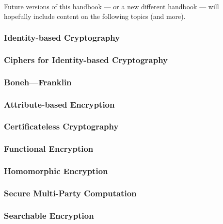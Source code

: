 \vspace{7.5cm}

Future versions of this handbook --- or a new different handbook --- will hopefully include content on the following topics (and more).

\subsubsection{Identity-based Cryptography}\label{future_sec:identity_based_cryptography}
\subsubsection{Ciphers for Identity-based Cryptography}\label{future_sec:identity_based_cryptography:ciphers}
\subsubsection{Boneh---Franklin}\label{future_sec:identity_based_cryptography:ciphers:boneh_franklin}
\subsubsection{Attribute-based Encryption}\label{future_sec:advanced_cryptography:attribute_based_encryption}
\subsubsection{Certificateless Cryptography}\label{future_sec:asymmetric_cryptography:certificateless}
\subsubsection{Functional Encryption}\label{future_sec:advanced_cryptography:functional_encryption}
\subsubsection{Homomorphic Encryption}\label{future_sec:advanced_cryptography:homomorphic_encryption}
\subsubsection{Secure Multi-Party Computation}\label{future_sec:advanced_cryptography:secure_multi_party_computation}
\subsubsection{Searchable Encryption}\label{future_sec:advanced_cryptography:searchable_encryption}
